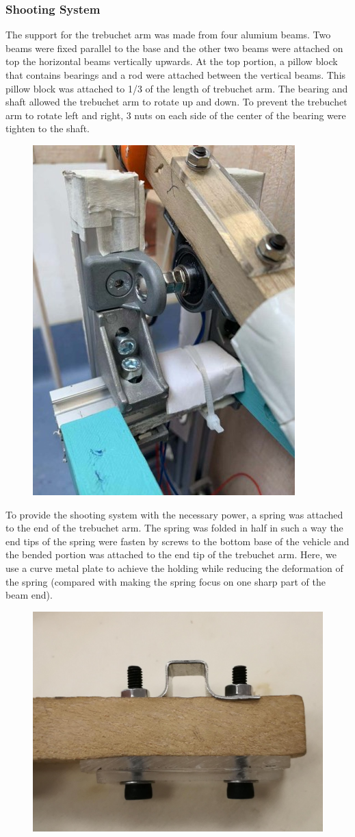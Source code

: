 \documentclass{article}
\begin{document}
\subsubsection*{Shooting System}
The support for the trebuchet arm was made from four alumium beams. Two beams were fixed parallel to the base and the other two beams were attached on top the horizontal beams vertically upwards.  At the top portion, a pillow block that contains bearings and a rod were attached between the vertical beams. This pillow block was attached to 1/3 of the length of trebuchet arm. The bearing and shaft allowed the trebuchet arm to rotate up and down. To prevent the trebuchet arm to rotate left and right, 3 nuts on each side of the center of the bearing were tighten to the shaft.
\begin{figure}[H]
\centering
\includegraphics[width=0.3\linewidth]{shaft}
\end{figure}

 To provide the shooting system with the necessary power, a spring was attached to the end of the trebuchet arm.  The spring was folded in half in such a way the end tips of the spring were fasten by screws to the bottom base of the vehicle and the bended portion was attached to the end tip of the trebuchet arm. Here, we use a curve metal plate to achieve the holding while reducing the deformation of the spring (compared with making the spring focus on one sharp part of the beam end).
 \begin{figure}[H]
\centering
\includegraphics[width=0.4\linewidth]{21}
\end{figure}
\end{document}
